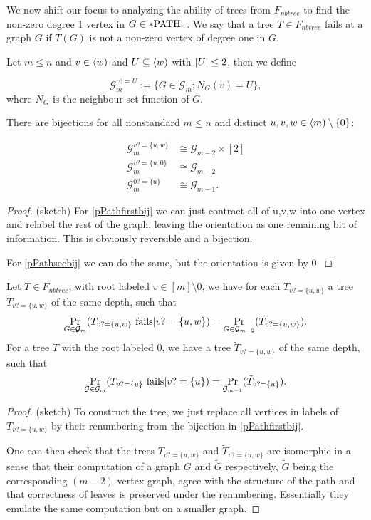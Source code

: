 We now shift our focus to analyzing the ability of trees from $F_{nbtree}$ to find the non-zero degree 1 vertex in $G\in *\text{PATH}_n$. We say that a tree $T\in F_{nbtree}$ fails at a graph $G$ if $T(G)$ is not a non-zero vertex of degree one in $G$.

\begin{defi}
Let $m\leq n$ and $v\in \langle w)$ and $U\subseteq \langle w)$ with $\left|{U}\right|\leq 2$, then we define 

\[\mathcal{G}_m^{v?=U}:=\{G\in\mathcal{G}_m;N_G(v)=U\},\]
where $N_G$ is the neighbour-set function of $G$.
\end{defi}
\begin{lemm}
There are bijections for all nonstandard $m\leq n$ and distinct $u,v,w\in \langle m)\setminus\{0\}$:

\begin{align}
\mathcal{G}_m^{v?=\{u,w\}}&\cong\mathcal{G}_{m-2}\times [2] \label{pPathfirstbij}\\
\mathcal{G}_m^{v?=\{u,0\}}&\cong\mathcal{G}_{m-2}\label{pPathsecbij}\\
\mathcal{G}_m^{0?=\{u\}}&\cong\mathcal{G}_{m-1}\label{pPaththrdbij}.
\end{align}
\end{lemm}
\begin{proof} (sketch)
For \eqref{pPathfirstbij} we can just contract all of {u,v,w} into one vertex and relabel the rest of the graph, leaving the orientation as one remaining bit of information. This is obviously reversible and a bijection.

For \eqref{pPathsecbij} we can do the same, but the orientation is given by $0$.
\end{proof}

\begin{lemm}\label{lemmrelabeltree}
Let $T\in F_{nbtree}$, with root labeled $v\in[m]\setminus{0}$, we have for each $T_{v?=\{u,w\}}$ a tree $\tilde T_{v?=\{u,w\}}$ of the same depth, such that
\begin{align}
\Pr_{G\in\mathcal{G}_m}(T_{v?=\{u,w\}}\text{ fails}|v?=\{u,w\})=\Pr_{G\in\mathcal{G}_{m-2}}(\tilde T_{v?=\{u,w\}}).
\end{align}
For a tree $T$ with the root labeled $0$, we have a tree $\tilde T_{v?=\{u,w\}}$ of the same depth, such that
\begin{align}
\Pr_{\mathcal{G}\in\mathcal{G}_m}(T_{v?=\{u\}}\text{ fails}|v?=\{u\})=\Pr_{\mathcal{G}_{m-1}}(\tilde T_{v?=\{u\}}).
\end{align}
\end{lemm}
\begin{proof}(sketch) To construct the tree, we just replace all vertices in labels of $T_{v?=\{u,w\}}$ by their renumbering from the bijection in \eqref{pPathfirstbij}.

One can then check that the trees $T_{v?=\{u,w\}}$ and $\tilde T_{v?=\{u,w\}}$ are isomorphic in a sense that their computation of a graph $G$ and $\tilde G$ respectively, $\tilde G$ being the corresponding $(m-2)$-vertex graph, agree with the structure of the path and that correctness of leaves is preserved under the renumbering. Essentially they emulate the same computation but on a smaller graph.
\end{proof}



